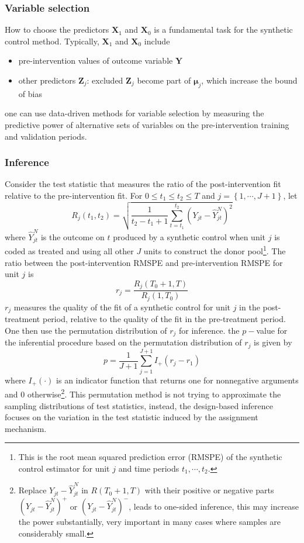 \documentclass[twoside]{article}
\begin{document}
\subsubsection{Variable selection}
How to choose the predictors $\mathbf{X}_1$ and $\mathbf{X}_0$ is a fundamental task for the synthetic control method. Typically, $\mathbf{X}_1$ and $\mathbf{X}_0$ include 
\begin{itemize}
    \item pre-intervention values of outcome variable $\mathbf{Y}$
    \item other predictors $\mathbf{Z}_j$: excluded $\mathbf{Z}_j$ become part of $\boldsymbol{\mu}_j$, which increase the bound of bias
\end{itemize}
one can use data-driven methods for variable selection by measuring the predictive power of alternative sets of variables on the pre-intervention training and validation periods.

\subsubsection{Inference}
Consider the test statistic that measures the ratio of the post-intervention fit relative to the pre-intervention fit. For $0\leq t_1\leq t_2\leq T$ and $j=\left\{1,\cdots,J+1\right\}$, let 
\begin{equation*}
    R_j\left(t_1,t_2\right) = \sqrt{\frac{1}{t_2-t_1+1}\sum^{t_2}_{t=t_1} \left(Y_{jt}-\hat{Y}^N_{jt}\right)^2}
\end{equation*}
where $\hat{Y}^N_{jt}$ is the outcome on $t$ produced by a synthetic control when unit $j$ is coded as treated and using all other $J$ units to construct the donor pool\footnote{This is the root mean squared prediction error (RMSPE) of the synthetic control estimator for unit $j$ and time periods $t_1,\cdots,t_2$.}. The ratio between the post-intervention RMSPE and pre-intervention RMSPE for unit $j$ is 
$$ r_j = \frac{R_j(T_0+1,T)}{R_j(1,T_0)} $$
$r_j$ measures the quality of the fit of a synthetic control for unit $j$ in the post-treatment period, relative to the quality of the fit in the pre-treatment period. One then use the permutation distribution of $r_j$ for inference. the $p-$value for the inferential procedure based on the permutation distribution of $r_j$ is given by $$ p = \frac{1}{J+1}\sum^{J+1}_{j=1}I_{+}\left(r_j-r_1\right) $$ 
where $I_{+}(\cdot)$ is an indicator function that returns one for nonnegative arguments and 0 otherwise\footnote{Replace $Y_{jt}-\hat{Y}_{jt}^N$ in $R(T_0+1,T)$ with their positive or negative parts $\left(Y_{jt}-\hat{Y}_{jt}^N\right)^+$ or $\left(Y_{jt}-\hat{Y}_{jt}^N\right)^-$, leads to one-sided inference, this may increase the power substantially, very important in many cases where samples are considerably small.}.
This permutation method is not trying to approximate the sampling distributions of test statistics, instead, the design-based inference focuses on the variation in the test statistic induced by the assignment mechanism.
\end{document}
